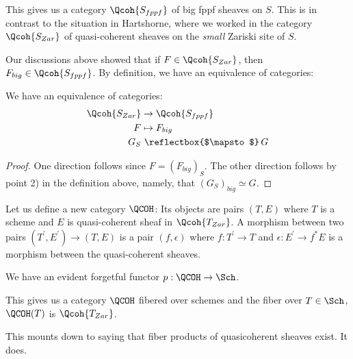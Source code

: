 \documentclass[11pt, english]{article}
\begin{document}
This gives us a category $\Qcoh {S_{fppf}}$ of big fppf sheaves on $S$. This is in contrast to the situation in Hartshorne, where we worked in the category $\Qcoh {S_{Zar}}$ of quasi-coherent sheaves on the \emph{small} Zariski site of $S$.

Our discussions above showed that if $F \in \Qcoh {S_{Zar}}$, then $F_{big} \in \Qcoh{S_{fppf}}$. By definition, we have an equivalence of categories:

\begin{lemma}
We have an equivalence of categories:
\begin{align*} 
\Qcoh{S_{Zar}} &\to \Qcoh{S_{fppf}} \\
F &\mapsto F_{big} \\
G_S &\text{ \reflectbox{$\mapsto$}} \, G
\end{align*}
\end{lemma} 
\begin{proof}
One direction follows since $F = (F_{big})_S$. The other direction follows by point 2) in the definition above, namely, that $(G_S)_{big} \simeq G$.
\end{proof}

Let us define a new category $\QCOH$: Its objects are pairs $(T,E)$ where $T$ is a scheme and $E$ is quasi-coherent sheaf in $\Qcoh{T_{Zar}}$. A morphism between two pairs $(T^\prime, E^\prime) \to (T,E)$ is a pair $(f,\epsilon)$ where $f:T^\prime \to T$ and $\epsilon: E^\prime \to f^\ast E$ is a morphism between the quasi-coherent sheaves.

We have an evident forgetful functor $p:\QCOH \to \Sch$. 
\begin{exc}
This gives us a category $\QCOH$ fibered over schemes and the fiber over $T \in \Sch$, $\QCOH(T)$ is $\Qcoh{T_{Zar}}$. 
\end{exc}
\begin{sol}
This mounts down to saying that fiber products of quasicoherent sheaves exist. It does.
\end{sol}
\end{document}
